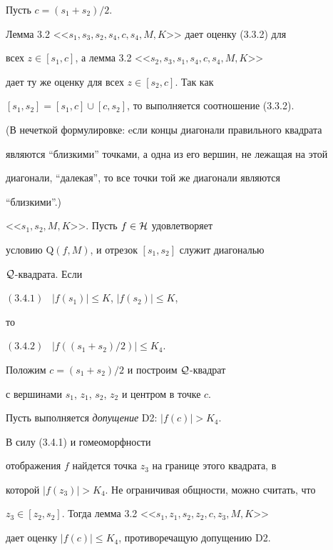\begin{pf}


Пусть $c=(s_1 + s_2)/2$. 


Лемма 3.2 <<$s_1, s_3, s_2, s_4, c, s_4, M, K$>> дает оценку (3.3.2) для 


всех $z\in [s_1,c]$, а лемма 3.2 <<$s_2, s_3, s_1, s_4, c, s_4, M, K$>> 


дает ту же оценку для всех $z\in [s_2, c]$. Так как 


$[s_1, s_2] = [s_1,c]\cup [c, s_2]$, то выполняется соотношение (3.3.2). 


\end{pf}





(В нечеткой формулировке: eсли концы диагонали правильного квадрата 


являются ``близкими'' точками, а одна из его вершин, не лежащая на этой 


диагонали, ``далекая'', то все точки той же диагонали являются 


``близкими''.)





\begin{lems}


<<$s_1, s_2, M, K$>>. Пусть $f\in {\cal H}$ удовлетворяет 


условию $\mathrm Q(f,M)$, и отрезок $[s_1, s_2]$ служит диагональю 


${\cal Q}$-квадрата. Если





$(3.4.1)$ \ $|f(s_1)| \leq K$, $|f(s_2)| \leq K$,





\noindent{}то





$(3.4.2)$ \ $|f((s_1 + s_2)/2)| \leq K_4 $.


\end{lems}


 


\begin{pf}


Положим $c=(s_1 + s_2)/2$ и построим ${\cal Q}$-квадрат 


с вершинами $s_1$, $z_1$, $s_2$, $z_2$ и центром в точке $c$. 


Пусть выполняется {\it допущение} D2: $|f(c)| > K_4$.


В силу (3.4.1) и гомеоморфности 


отображения $f$ найдется точка $z_3$ на границе этого квадрата, в 


которой $|f(z_3)| > K_4$. Не ограничивая общности, можно считать, что 


$z_3 \in [z_2, s_2]$. Тогда лемма 3.2 <<$s_1, z_1, s_2, z_2, c, z_3, M, K$>> 


дает оценку $|f(c)|\leq K_4$, противоречащую допущению D2. 


\end{pf}





